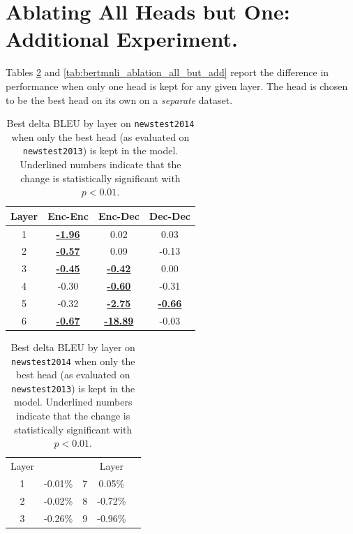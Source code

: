 
\section{Ablating All Heads but One: Additional Experiment.}
\label{sec:ablating_all_but_one_add}

Tables \ref{tab:tfwmt_ablation_all_but_add} and \ref{tab:bertmnli_ablation_all_but_add} report the difference in performance when only one head is kept for any given layer. The head is chosen to be the best head on its own on a \emph{separate} dataset.
\begin{table}[h!]
\begin{minipage}{0.45\textwidth}
\centering
\begin{tabular}{c|ccc}
Layer & Enc-Enc & Enc-Dec & Dec-Dec \\
\hline\hline
1 & \color{Maroon} \underline{\bf -1.96} & \color{NavyBlue} 0.02 & \color{NavyBlue} 0.03 \\
2 & \color{Maroon} \underline{\bf -0.57} & \color{NavyBlue} 0.09 & \color{Maroon} -0.13 \\
3 & \color{Maroon} \underline{\bf -0.45} & \color{Maroon} \underline{\bf -0.42} & \color{Maroon} 0.00 \\
4 & \color{Maroon} -0.30 & \color{Maroon} \underline{\bf -0.60} & \color{Maroon} -0.31 \\
5 & \color{Maroon} -0.32 & \color{Maroon} \underline{\bf -2.75} & \color{Maroon} \underline{\bf -0.66} \\
6 & \color{Maroon} \underline{\bf -0.67} & \color{Maroon} \underline{\bf -18.89} & \color{Maroon} -0.03 \\
\hline
\end{tabular}
\caption{\label{tab:tfwmt_ablation_all_but_add} Best delta BLEU by layer on \texttt{newstest2014} when only the best head (as evaluated on \texttt{newstest2013}) is kept in the \tfwmt{} model. Underlined numbers indicate that the change is statistically significant with $p<0.01$.}
\end{minipage}\hspace{1cm}
\begin{minipage}{0.45\textwidth}
\centering
\begin{tabular}{c|ccc|c}
Layer &  & & Layer &  \\
\hhline{==~==}
1 & \color{Maroon} -0.01\% & 7 & \color{NavyBlue} 0.05\% \\
2 & \color{Maroon} -0.02\% & 8 & \color{Maroon} -0.72\% \\
3 & \color{Maroon} -0.26\% & 9 & \color{Maroon} -0.96\% \\

\end{tabular}
\end{minipage}
\end{table}
